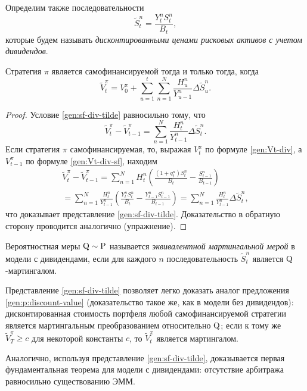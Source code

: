 Определим также последовательности
\[
\tilde S_t^n = \frac{Y_t^nS_t^n}{B_t},
\]
которые будем называть \emph{дисконтированными ценами рисковых активов с учетом дивидендов}.


\begin{proposition}
Стратегия $\pi$ является самофинансируемой тогда и только тогда, когда
\begin{equation}
\label{gen:sf-div-tilde}
\tilde V_t^\pi = V_0^\pi + \sum_{u=1}^t \sum_{n=1}^N \frac{H_u^n}{Y_{u-1}^n} \Delta \tilde S_u^n.
\end{equation}
\end{proposition}
\begin{proof}
Условие \eqref{gen:sf-div-tilde} равносильно тому, что
\[
\tilde V_t^\pi -\tilde V_{t-1}^\pi = \sum_{n=1}^N \frac{H_t^n}{Y_{t-1}^n} \Delta \tilde S_t^n. 
\]
Если стратегия $\pi$ самофинансируемая, то, выражая $V_t^\pi$ по формуле \eqref{gen:Vt-div}, а $V_{t-1}^\pi$ по формуле \eqref{gen:Vt-div-sf}, находим
\begin{multline*}
\tilde V_t^\pi -\tilde V_{t-1}^\pi 
= \sum_{n=1}^N H_t^n \left(\frac{(1+q_t^n)S_t^n}{B_t} - \frac{S_{t-1}^n}{B_{t-1}}\right)
\\= \sum_{n=1}^N \frac{H_t^n}{Y_{t-1}^n} \left(\frac{Y_t^nS_t^n}{B_t} - \frac{Y_{t-1}^nS_{t-1}^n}{B_{t-1}}\right)
=\sum_{n=1}^N \frac{H_t^n}{Y_{t-1}^n} \Delta \tilde S_t^n,
\end{multline*}
что доказывает представление \eqref{gen:sf-div-tilde}. Доказательство в обратную сторону проводится аналогично (упражнение). 
\end{proof}

\begin{definition}
Вероятностная меры $\mathrm{Q}\sim\mathrm{P}$ называется \emph{эквивалентной мартингальной мерой} в модели с дивидендами, если для каждого $n$ последовательность $\tilde S_t^n$ является $\mathrm{Q}$-мартингалом.
\end{definition}

Представление \eqref{gen:sf-div-tilde} позволяет легко доказать аналог предложения \ref{gen:p:discount-value} (доказательство такое же, как в модели без дивидендов): дисконтированная стоимость портфеля любой самофинансируемой стратегии является мартингальным преобразованием относительно $\mathrm{Q}$; если к тому же $\tilde V_T^\pi \ge c$ для некоторой константы $c$, то $\tilde V_t^\pi$  является мартингалом.

Аналогично, используя представление \eqref{gen:sf-div-tilde}, доказывается первая фундаментальная теорема для модели с дивидендами: отсутствие арбитража равносильно существованию ЭММ.

